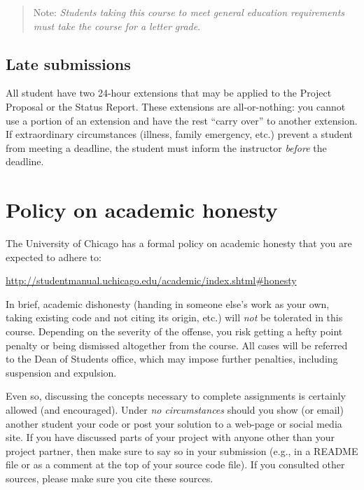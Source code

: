 \documentclass[11pt]{article}
\begin{document}
\begin{quote}
Note: \emph{Students taking this course to meet general education requirements must take the course for a letter grade}. 
\end{quote}

\subsection{Late submissions}

All student have two 24-hour extensions that may be applied to
the Project Proposal or the Status Report.
These extensions are all-or-nothing: you cannot use a portion of an extension and have the
rest ``carry over'' to another extension. If extraordinary
circumstances (illness, family emergency, etc.) prevent a student from
meeting a deadline, the student must inform the instructor
\emph{before} the deadline.


\section{Policy on academic honesty}

The University of Chicago has a formal policy on academic honesty that you are expected to adhere to:

\begin{center}
\url{http://studentmanual.uchicago.edu/academic/index.shtml#honesty}
\end{center}

In brief, academic dishonesty (handing in someone else's work as your
own, taking existing code and not citing its origin, etc.) will
\emph{not} be tolerated in this course. Depending on the severity of
the offense, you risk getting a hefty point penalty or being dismissed
altogether from the course. All cases will be referred to the Dean of
Students office, which may impose further penalties, including
suspension and expulsion.

Even so, discussing the concepts necessary to complete assignments is
certainly allowed (and encouraged).  Under \emph{no circumstances}
should you show (or email) another student your code or post your
solution to a web-page or social media site.  If you have discussed
parts of your project with anyone other than your project partner, 
then make sure to say so in your submission (e.g., in a README file 
or as a comment at the top of your source code file). If
you consulted other sources, please make sure you cite these sources.
\end{document}
